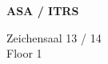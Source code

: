 \documentclass[a4paper]{article}
\begin{document}
\printGenericVSLHeader
\begin{center}
\begin{vsltext}{3cm}{4cm}

   \vspace{0.5cm} 

    \textbf{ASA / ITRS} 

    \vspace{1.5cm}

   Zeichensaal 13 / 14 \\
   Floor 1

\end{vsltext}

\end{center}
\end{document}
